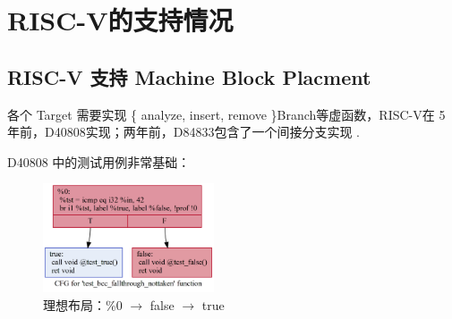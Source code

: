 \section{RISC-V的支持情况}

\subsection{RISC-V 支持 Machine Block Placment}

各个 Target 需要实现 \{ analyze, insert, remove \}Branch等虚函数，RISC-V在 5 年前，D40808\cite{llvmriscvimplbranchanalysis2017}实现；两年前，D84833包含了一个间接分支实现 \cite{llvmriscvimplindirect2020}.

D40808\cite{llvmriscvimplbranchanalysis2017} 中的测试用例非常基础：

\begin{figure}[H]
    \centering
    \includegraphics[width=0.45\textwidth]{images/not_taken_riscv.png}
    \caption{理想布局：\%0 $\rightarrow$ false $\rightarrow$ true}
\end{figure}